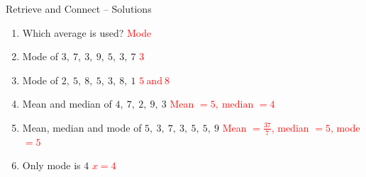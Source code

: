 \documentclass{beamer}
\begin{document}
\begin{frame}{Retrieve and Connect -- Solutions}
\vspace{-0.8em}

\footnotesize
\begin{enumerate}\itemsep2pt
  \item Which average is used?  
        \textcolor{red}{Mode}
  \item Mode of $3,\ 7,\ 3,\ 9,\ 5,\ 3,\ 7$  
        \textcolor{red}{$3$}
  \item Mode of $2,\ 5,\ 8,\ 5,\ 3,\ 8,\ 1$  
        \textcolor{red}{$5\ \text{and}\ 8$}
  \item Mean and median of $4,\ 7,\ 2,\ 9,\ 3$  
        \textcolor{red}{Mean $=5,\ \text{median }=4$}
  \item Mean, median and mode of $5,\ 3,\ 7,\ 3,\ 5,\ 5,\ 9$  
        \textcolor{red}{Mean $=\frac{37}{7}$, median $=5$, mode $=5$}
  \item Only mode is $4$  
        \textcolor{red}{$x=4$}
\end{enumerate}
\end{frame}
\end{document}

